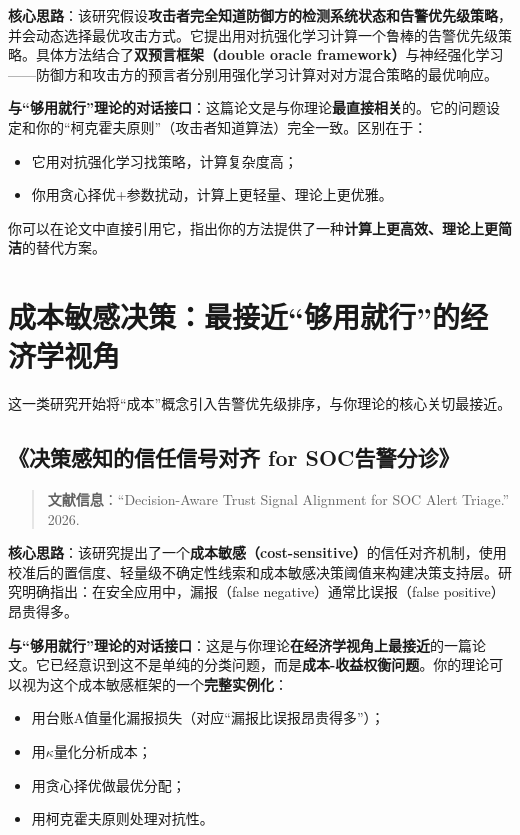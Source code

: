 \documentclass[11pt,a4paper]{article}
\begin{document}
\textbf{核心思路}：该研究假设\textbf{攻击者完全知道防御方的检测系统状态和告警优先级策略}，并会动态选择最优攻击方式。它提出用对抗强化学习计算一个鲁棒的告警优先级策略。具体方法结合了\textbf{双预言框架（double oracle framework）}与神经强化学习——防御方和攻击方的预言者分别用强化学习计算对对方混合策略的最优响应。

\textbf{与“够用就行”理论的对话接口}：这篇论文是与你理论\textbf{最直接相关}的。它的问题设定和你的“柯克霍夫原则”（攻击者知道算法）完全一致。区别在于：
\begin{itemize}
    \item 它用对抗强化学习找策略，计算复杂度高；
    \item 你用贪心择优+参数扰动，计算上更轻量、理论上更优雅。
\end{itemize}
你可以在论文中直接引用它，指出你的方法提供了一种\textbf{计算上更高效、理论上更简洁}的替代方案。

\section{成本敏感决策：最接近“够用就行”的经济学视角}

这一类研究开始将“成本”概念引入告警优先级排序，与你理论的核心关切最接近。

\subsection{《决策感知的信任信号对齐 for SOC告警分诊》}

\begin{quote}
\textbf{文献信息}：“Decision-Aware Trust Signal Alignment for SOC Alert Triage.” 2026.
\end{quote}

\textbf{核心思路}：该研究提出了一个\textbf{成本敏感（cost-sensitive）}的信任对齐机制，使用校准后的置信度、轻量级不确定性线索和成本敏感决策阈值来构建决策支持层。研究明确指出：在安全应用中，漏报（false negative）通常比误报（false positive）昂贵得多。

\textbf{与“够用就行”理论的对话接口}：这是与你理论\textbf{在经济学视角上最接近}的一篇论文。它已经意识到这不是单纯的分类问题，而是\textbf{成本-收益权衡问题}。你的理论可以视为这个成本敏感框架的一个\textbf{完整实例化}：
\begin{itemize}
    \item 用台账A值量化漏报损失（对应“漏报比误报昂贵得多”）；
    \item 用$\kappa$量化分析成本；
    \item 用贪心择优做最优分配；
    \item 用柯克霍夫原则处理对抗性。
\end{itemize}
\end{document}
